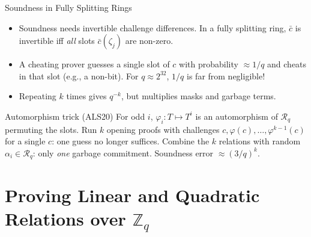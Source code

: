 \documentclass{zkdl-presentation-template}
\begin{document}
    \begin{frame}{Soundness in Fully Splitting Rings}
        \begin{itemize}
            \item Soundness needs invertible challenge differences. In a fully splitting ring, $\bar{c}$ is invertible iff \emph{all} slots $\bar{c}(\zeta_j)$ are non-zero.\pause
            \item A cheating prover guesses a single slot of $c$ with probability $\approx 1/q$ and cheats in that slot (e.g., a non-bit). For $q \approx 2^{32}$, $1/q$ is far from negligible!\pause
            \item Repeating $k$ times gives $q^{-k}$, but multiplies masks and garbage terms.
        \end{itemize}
        \pause

        \begin{block}{Automorphism trick (ALS20)}
            For odd $i$, $\varphi_i: T \mapsto T^i$ is an automorphism of $\mathcal{R}_q$ permuting the slots. Run $k$ opening proofs with challenges $c, \varphi(c), \dots, \varphi^{k-1}(c)$ for a single $c$: one guess no longer suffices. Combine the $k$ relations with random $\alpha_i \in \mathcal{R}_q$: only \emph{one} garbage commitment. Soundness error $\approx (3/q)^k$.
        \end{block}
    \end{frame}

    \section[Relations over $\mathbb{Z}_q$]{Proving Linear and Quadratic Relations over $\mathbb{Z}_q$}
\end{document}
